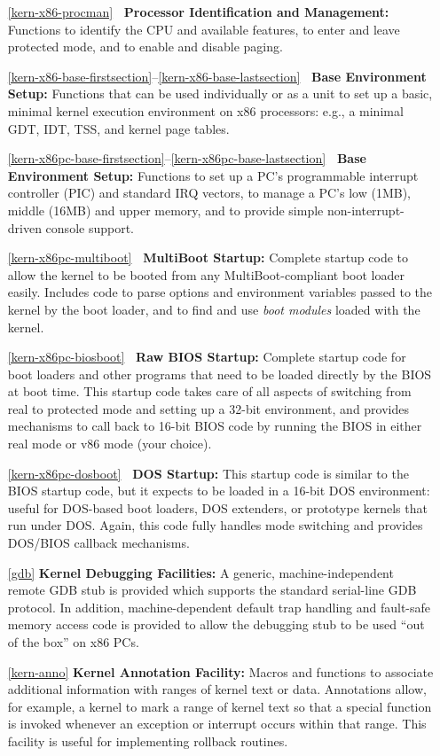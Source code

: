 \begin{itemize}
\item[\ref{kern-x86-procman}]
	{\bf\intel\ Processor Identification and Management:}
	Functions to identify the CPU and available features,
	to enter and leave protected mode,
	and to enable and disable paging.
\item[\ref{kern-x86-base-firstsection}--\ref{kern-x86-base-lastsection}]
	{\bf\intel\ Base Environment Setup:}
	Functions that can be used individually or as a unit
	to set up a basic, minimal kernel execution environment
	on x86 processors:
	e.g., a minimal GDT, IDT, TSS, and kernel page tables.
\item[\ref{kern-x86pc-base-firstsection}--\ref{kern-x86pc-base-lastsection}]
	{\bf\intelpc\ Base Environment Setup:}
	Functions to set up a PC's programmable interrupt controller (PIC)
	and standard IRQ vectors,
	to manage a PC's low (1MB), middle (16MB) and upper memory,
	and to provide simple non-interrupt-driven console support.
\item[\ref{kern-x86pc-multiboot}]
	{\bf\intelpc\ MultiBoot Startup:}
	Complete startup code to allow the kernel to be booted
	from any MultiBoot-compliant boot loader easily.
	Includes code to parse options and environment variables
	passed to the kernel by the boot loader,
	and to find and use \emph{boot modules} loaded with the kernel.
\item[\ref{kern-x86pc-biosboot}]
	{\bf\intelpc\ Raw BIOS Startup:}
	Complete startup code for boot loaders and other programs
	that need to be loaded directly by the BIOS at boot time.
	This startup code takes care of all aspects
	of switching from real to protected mode
	and setting up a 32-bit environment,
	and provides mechanisms to call back to 16-bit BIOS code
	by running the BIOS in either real mode or v86 mode (your choice).
\item[\ref{kern-x86pc-dosboot}]
	{\bf\intelpc\ DOS Startup:}
	This startup code is similar to the BIOS startup code,
	but it expects to be loaded in a 16-bit DOS environment:
	useful for DOS-based boot loaders, DOS extenders,
	or prototype kernels that run under DOS\@.
	Again, this code fully handles mode switching
	and provides DOS/BIOS callback mechanisms.
\item[\ref{gdb}]
	{\bf Kernel Debugging Facilities:}
	A generic, machine-independent remote GDB stub is provided
	which supports the standard serial-line GDB protocol.
	In addition, machine-dependent default trap handling
	and fault-safe memory access code is provided
	to allow the debugging stub to be used ``out of the box'' on x86 PCs.
\item[\ref{kern-anno}]
	{\bf Kernel Annotation Facility:}
	Macros and functions to associate additional information with ranges
	of kernel text or data.
	Annotations allow, for example, a kernel to mark a range of kernel
	text so that a special function is invoked whenever an exception
	or interrupt occurs within that range.
	This facility is useful for implementing rollback routines.
\end{itemize}

